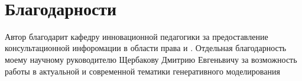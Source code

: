 \

\section{Благодарности}

Автор благодарит кафедру инновационной педагогики за предоставление консультационной инфоромации в области права
и . Отдельная благодарность моему научному руководителю Щербакову Дмитрию Евгеньвичу
за возможность работы в актуальной и современной тематики генеративного моделирования